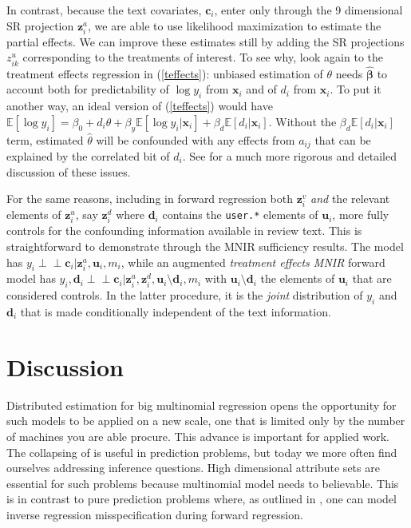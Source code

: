 \documentclass[12pt]{article}
\newcommand{\bs}[1]{\boldsymbol{#1}}
\newcommand{\bm}[1]{\mathbf{#1}}
\newcommand{\ds}[1]{\mathds{#1}}
\newcommand{\indep}{\perp\!\!\!\perp}
\newcommand{\cd}[1]{{\tt#1}}
\begin{document}
In contrast, because the text covariates, $\bm{c}_i$, enter only through the 9
dimensional SR projection $\bm{z}^a_i$, we are able to use likelihood maximization
 to estimate the partial effects.
We can improve these estimates still by adding the SR
projections $z^u_{ik}$ corresponding to the treatments of interest.    To see why, look
again to the treatment effects regression in (\ref{teffects}): 
unbiased estimation of $\theta$ needs $\bs{\hat\beta}$ to account both for
predictability of $\log y_i$ from $\bm{x}_i$ and of $d_i$ from $\bm{x}_i$.  To
put it another way, an ideal version of (\ref{teffects}) would have $\ds{E}[\log y_i] = \beta_0 + d_i\theta  + \beta_y \ds{E}[\log y_i
| \bm{x}_i] + \beta_d \ds{E}[d_i | \bm{x}_i]$.  Without the $\beta_d \ds{E}[d_i | \bm{x}_i]$ 
term, estimated $\hat\theta$ will be confounded with any effects from
$a_{ij}$ that can be explained by the correlated bit of $d_i$.  See
\citet{belloni_inference_2012} for a much more rigorous and detailed
discussion of these issues.

For the same reasons, including in forward regression both $\bm{z}_i^v$ {\it
and} the relevant elements of $\bm{z}_i^u$, say $\bm{z}_i^d$ where $\bm{d}_i$
contains the \cd{user.*} elements of $\bm{u}_i$, more fully controls for the
confounding information available in review text. This is straightforward to
demonstrate through the MNIR sufficiency results.  The model  has $y_i \indep
\bm{c}_i | \bm{z}^a_i, \bm{u}_i, m_i$, while an augmented {\it treatment
effects MNIR} forward model has $y_i, \bm{d}_i \indep
\bm{c}_i | \bm{z}^a_i,\bm{z}^d_i, \bm{u}_i\!\setminus\!\bm{d}_i, m_i$ with
$\bm{u}_i\!\setminus\!\bm{d}_i$ the  elements of $\bm{u}_i$ that are
considered controls. In the latter procedure, it is  the {\it joint}
distribution of $y_i$ and $\bm{d}_i$ that is made conditionally independent of
the text information.

\section{Discussion}
\label{END}

Distributed estimation for big multinomial regression opens the opportunity
for such models to be applied on a new  scale, one that is limited only by the
number of machines you are able procure. This advance is important for applied
work.  The collapsing of
\cite{taddy_multinomial_2013} is useful in prediction problems, but today
we more often find ourselves addressing inference questions.  High dimensional
attribute sets are essential for such problems because multinomial model needs
to believable. This is in contrast to pure prediction problems where, as
outlined in \cite{taddy_rejoinder:_2013}, one can model inverse regression
misspecification during forward regression.
\end{document}
